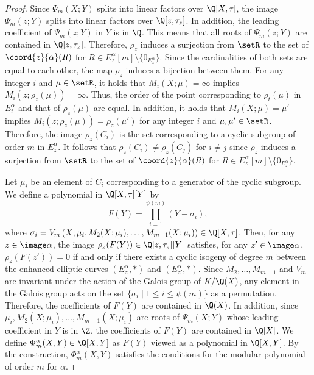 \documentclass{amsart}
\theoremstyle{definition}
\theoremstyle{remark}
\numberwithin{equation}{section}
\begin{document}
\begin{proof}
    Since $\Psi_m(X; Y)$ splits into linear factors over $\Q[X, \tau]$,
    the image $\Psi_m(z; Y)$ splits into linear factors over $\Q[z, \tau_z]$.
    In addition,
    the leading coefficient of $\Psi_m(z; Y)$ in $Y$ is in $\Q$.
    This means that all roots of $\Psi_m(z; Y)$ are contained in $\Q[z, \tau_z]$.
    Therefore, $\rho_{z}$ induces a surjection from $\setR$
    to the set of $\coord{z}{\alpha}(R)$ for $R \in E_z^\alpha[m]\setminus\{0_{E_z^\alpha}\}$.
    Since the cardinalities of both sets are equal to each other,
    the map $\rho_{z}$ induces a bijection between them.
    For any integer $i$ and $\mu \in \setR$,
    it holds that $M_i(X; \mu) = \infty$ implies $M_i(z; \rho_{z}(\mu)) = \infty$.
    Thus, the order of the point corresponding to $\rho_t(\mu)$ in $E_{t}^\alpha$
    and that of $\rho_{z}(\mu)$ are equal.
    In addition,
    it holds that $M_i(X; \mu) = \mu'$ implies
    $M_i(z; \rho_{z}(\mu)) = \rho_{z}(\mu')$
    for any integer $i$ and $\mu, \mu' \in \setR$.
    Therefore, the image $\rho_{z}(C_i)$
    is the set corresponding to
    a cyclic subgroup of order $m$ in $E_{z}^\alpha$.
    It follows that $\rho_{z}(C_i) \neq \rho_{z}(C_j)$ for $i \neq j$
    since $\rho_z$ induces a surjection from $\setR$ to
    the set of $\coord{z}{\alpha}(R)$ for $R \in E_z^\alpha[m]\setminus\{0_{E_z^\alpha}\}$.

    Let $\mu_i$ be an element of $C_i$ corresponding to a generator of the cyclic subgroup.
    We define a polynomial in $\Q[X, \tau][Y]$ by
    \begin{equation}\label{eq:def_mod_poly}
        F(Y) = \prod_{i=1}^{\psi(m)} (Y - \sigma_i),
    \end{equation}
    where
    $\sigma_i = V_m\left(X; \mu_i, M_2(X; \mu_i), \dots, M_{m-1}(X; \mu_i)\right) \in \Q[X, \tau]$.
    Then, for any $z \in \image \alpha$, the image $\rho_z(F(Y)) \in \Q[z, \tau_z][Y]$ satisfies,
    for any $z' \in \image \alpha$,
    $\rho_z(F(z')) = 0$
    if and only if there exists a cyclic isogeny of degree $m$
    between the enhanced elliptic curves
    $(E_z^\alpha, \ast)$ and $(E_{z'}^\alpha, \ast)$.
    Since $M_2, \dots, M_{m-1}$ and $V_m$ are invariant under
    the action of the Galois group of $K/\Q(X)$,
    any element in the Galois group acts on the set $\{\sigma_i \mid 1 \leq i \leq \psi(m)\}$
    as a permutation.
    Therefore, the coefficients of $F(Y)$ are contained in $\Q(X)$.
    In addition,
    since $\mu_i, M_2(X; \mu_i), \dots, M_{m-1}(X; \mu_i)$
    are roots of $\Psi_m(X; Y)$ whose leading coefficient in $Y$ is in $\Z$,
    the coefficients of $F(Y)$ are contained in $\Q[X]$.
    We define $\Phi_m^{\alpha}(X, Y) \in \Q[X, Y]$
    as $F(Y)$ viewed as a polynomial in $\Q[X, Y]$.
    By the construction,
    $\Phi_m^{\alpha}(X, Y)$ satisfies the conditions for the modular polynomial of order $m$ for $\alpha$.
\end{proof}
\end{document}

